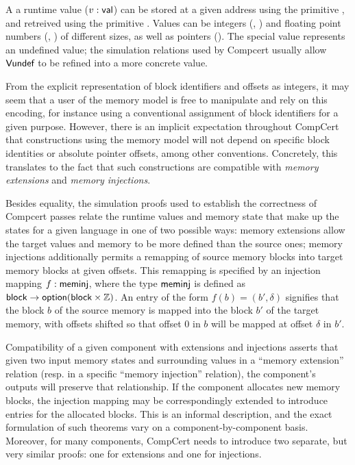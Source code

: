 A a runtime value ($v :  \textsf{val} $) can be stored at
a given address using the primitive ,
and retreived using the primitive .
Values can be integers (, ) and
floating point numbers (, )
of different sizes,
as well as pointers ().
The special value 
represents an undefined value;
the simulation relations used by Compcert
usually allow $ \textsf{Vundef} $
to be refined into a more concrete value.

From the explicit representation of
block identifiers and offsets as integers,
it may seem that a user of the memory model
is free to manipulate and rely on this encoding,
for instance using a conventional assignment of block identifiers
for a given purpose.
However,
there is an implicit expectation throughout CompCert
that constructions using the memory model
will not depend on specific block identities
or absolute pointer offsets,
among other conventions.
Concretely,
this translates to the fact that such constructions
are compatible with \emph{memory extensions} and \emph{memory injections}.

Besides equality,
the simulation proofs used
to establish the correctness of Compcert passes
relate the runtime values and memory state
that make up the states for a given language
in one of two possible ways:
memory extensions
allow the target values and memory to be more defined
than the source ones;
memory injections
additionally permits a remapping of source memory blocks
into target memory blocks at given offsets.
This remapping is specified by an injection mapping
$f :  \textsf{meminj} $,
where the type $ \textsf{meminj} $ is defined as
$ \textsf{block}  \rightarrow  \textsf{option} ( \textsf{block}  \times \mathbb{Z})$.
An entry of the form $f(b) = (b', \delta)$
signifies that the block $b$ of the source memory
is mapped into the block $b'$ of the target memory,
with offsets shifted so that
offset $0$ in $b$ will be mapped at offset $\delta$ in $b'$.

Compatibility of a given component
with extensions and injections
asserts that given two input memory states and surrounding values
in a ``memory extension'' relation
(resp. in a specific ``memory injection'' relation),
the component's outputs will preserve that relationship.
If the component allocates new memory blocks,
the injection mapping may be correspondingly extended
to introduce entries for the allocated blocks.
This is an informal description,
and the exact formulation of such theorems
vary on a component-by-component basis.
Moreover,
for many components,
CompCert needs to introduce two separate,
but very similar proofs:
one for extensions and one for injections.

